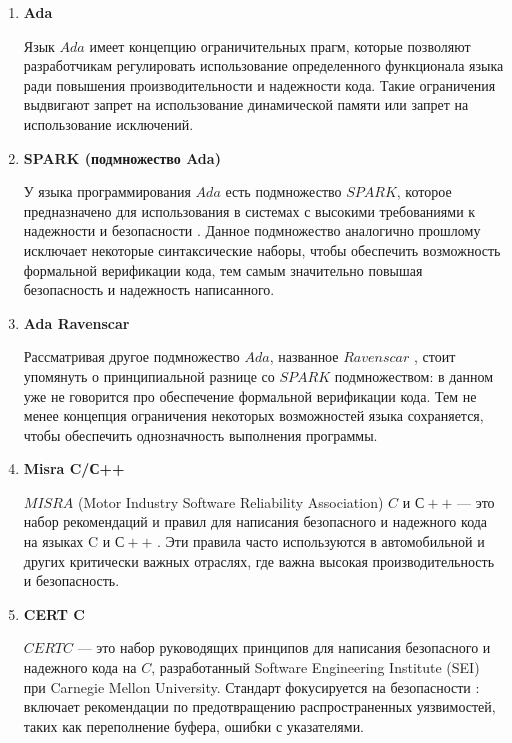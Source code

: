 \documentclass{mipt-thesis-bs}
\begin{document}
\begin{enumerate}
        \item \textbf{Ada}

        Язык $Ada$ имеет концепцию ограничительных прагм, которые позволяют разработчикам регулировать
        использование определенного функционала языка ради повышения производительности и надежности
        кода. Такие ограничения выдвигают запрет на использование динамической памяти или
        запрет на использование исключений.

        \item \textbf{SPARK (подмножество Ada)}

        У языка программирования $Ada$ есть подмножество $SPARK$, которое предназначено для
        использования в системах с высокими требованиями к надежности и безопасности \cite{spark}. Данное
        подмножество аналогично прошлому исключает некоторые синтаксические наборы, чтобы
        обеспечить возможность формальной верификации кода, тем самым значительно повышая
        безопасность и надежность написанного.

        \item \textbf{Ada Ravenscar}

        Рассматривая другое подмножество $Ada$, названное $Ravenscar$ \cite{ravenscar}, стоит упомянуть о принципиальной
        разнице со $SPARK$ подмножеством: в данном уже не говорится про обеспечение формальной верификации
        кода. Тем не менее концепция ограничения некоторых возможностей языка сохраняется, чтобы
        обеспечить однозначность выполнения программы.

        \item \textbf{Misra C/С++}

        $MISRA$ (Motor Industry Software Reliability Association) $C$ и $С++$ — это набор
        рекомендаций и правил для написания безопасного и надежного кода на
        языках C и $С++$ \cite{misra}. Эти правила часто используются в автомобильной и
        других критически важных отраслях, где важна высокая производительность и безопасность.

        \item \textbf{CERT C}

        $CERT C$ — это набор руководящих принципов для написания безопасного и надежного
        кода на $C$, разработанный Software Engineering Institute (SEI) при Carnegie Mellon University.
        Стандарт фокусируется на безопасности \cite{cert}: включает рекомендации по предотвращению
        распространенных уязвимостей, таких как переполнение буфера, ошибки с указателями.


\end{enumerate}
\end{document}
